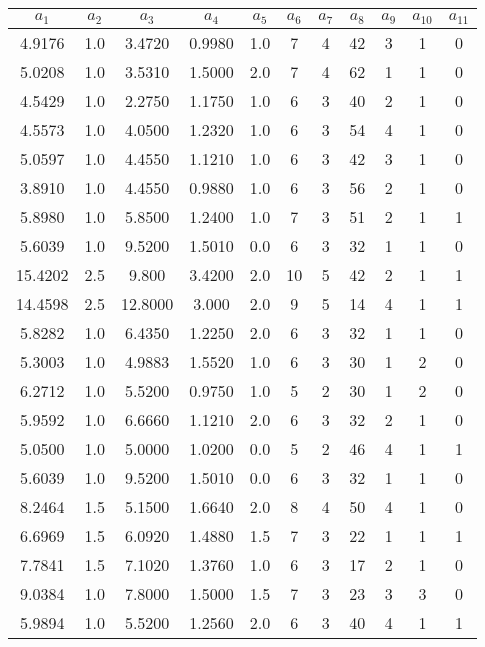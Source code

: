 \begin{table}[ht]
    \centering
    \begin{tabular}{ccccccccccc}
        \hline
        $a_1$ & $a_2$ & $a_3$ & $a_4$ & $a_5$ & $a_6$ & $a_7$ & $a_8$ & $a_9$ & $a_{10}$ & $a_{11}$ \\
        \hline
        4.9176 & 1.0 & 3.4720 & 0.9980 & 1.0 & 7 & 4 & 42 & 3 & 1 & 0 \\
        5.0208 & 1.0 & 3.5310 & 1.5000 & 2.0 & 7 & 4 & 62 & 1 & 1 & 0 \\
        4.5429 & 1.0 & 2.2750 & 1.1750 & 1.0 & 6 & 3 & 40 & 2 & 1 & 0 \\
        4.5573 & 1.0 & 4.0500 & 1.2320 & 1.0 & 6 & 3 & 54 & 4 & 1 & 0 \\
        5.0597 & 1.0 & 4.4550 & 1.1210 & 1.0 & 6 & 3 & 42 & 3 & 1 & 0 \\
        3.8910 & 1.0 & 4.4550 & 0.9880 & 1.0 & 6 & 3 & 56 & 2 & 1 & 0 \\
        5.8980 & 1.0 & 5.8500 & 1.2400 & 1.0 & 7 & 3 & 51 & 2 & 1 & 1 \\
        5.6039 & 1.0 & 9.5200 & 1.5010 & 0.0 & 6 & 3 & 32 & 1 & 1 & 0 \\
        15.4202 & 2.5 & 9.800 & 3.4200 & 2.0 & 10 & 5 & 42 & 2 & 1 & 1 \\
        14.4598 & 2.5 & 12.8000 & 3.000 & 2.0 & 9 & 5 & 14 & 4 & 1 & 1 \\
        5.8282 & 1.0 & 6.4350 & 1.2250 & 2.0 & 6 & 3 & 32 & 1 & 1 & 0 \\
        5.3003 & 1.0 & 4.9883 & 1.5520 & 1.0 & 6 & 3 & 30 & 1 & 2 & 0 \\
        6.2712 & 1.0 & 5.5200 & 0.9750 & 1.0 & 5 & 2 & 30 & 1 & 2 & 0 \\
        5.9592 & 1.0 & 6.6660 & 1.1210 & 2.0 & 6 & 3 & 32 & 2 & 1 & 0 \\
        5.0500 & 1.0 & 5.0000 & 1.0200 & 0.0 & 5 & 2 & 46 & 4 & 1 & 1 \\
        5.6039 & 1.0 & 9.5200 & 1.5010 & 0.0 & 6 & 3 & 32 & 1 & 1 & 0 \\
        8.2464 & 1.5 & 5.1500 & 1.6640 & 2.0 & 8 & 4 & 50 & 4 & 1 & 0 \\
        6.6969 & 1.5 & 6.0920 & 1.4880 & 1.5 & 7 & 3 & 22 & 1 & 1 & 1 \\
        7.7841 & 1.5 & 7.1020 & 1.3760 & 1.0 & 6 & 3 & 17 & 2 & 1 & 0 \\
        9.0384 & 1.0 & 7.8000 & 1.5000 & 1.5 & 7 & 3 & 23 & 3 & 3 & 0 \\
        5.9894 & 1.0 & 5.5200 & 1.2560 & 2.0 & 6 & 3 & 40 & 4 & 1 & 1 \\

\end{tabular}
\end{table}
